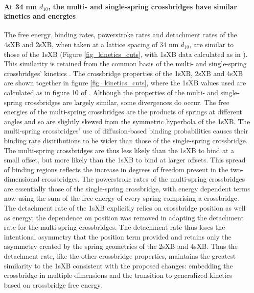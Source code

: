 \documentclass[]{article}
\begin{document}
\paragraph{At 34 nm $d_{10}$, the multi- and single-spring crossbridges have similar kinetics and energies} %
The free energy, binding rates, powerstroke rates and detachment rates of the 4sXB and 2sXB, when taken at a lattice spacing of 34 nm $d_{10}$, are similar to those of the 1sXB (Figure \ref{fig_kinetics_cuts}, with 1sXB data calculated as in \cite{Tanner2007}). 
This similarity is retained from the common basis of the multi- and single-spring crossbridges' kinetics \citep{Pate1989}.
The crossbridge properties of the 1sXB, 2sXB and 4sXB are shown together in figure \ref{fig_kinetics_cuts}, where the 1sXB values used are calculated as in figure 10 of \citet{Tanner:2007:pe115}. 
Although the properties of the multi- and single-spring crossbridges are largely similar, some divergences do occur. 
The free energies of the multi-spring crossbridges are the products of springs at different angles and so are slightly skewed from the symmetric hyperbola of the 1sXB.
The multi-spring crossbridges' use of diffusion-based binding probabilities  causes their binding rate distributions to be wider than those of the single-spring crossbridge.
The multi-spring crossbridges are thus less likely than the 1sXB to bind at a small offset, but more likely than the 1sXB to bind at larger offsets. 
This spread of binding regions reflects the increase in degrees of freedom present in the two-dimensional crossbridges. 
The powerstroke rates of the multi-spring crossbridges are essentially those of the single-spring crossbridge, with energy dependent terms now using the  sum of the free energy of every spring comprising a crossbridge. 
The detachment rate of the 1sXB explicitly relies on crossbridge position as well as energy; the dependence on position was removed in adapting the detachment rate for the multi-spring crossbridges. 
The detachment rate thus loses the intentional asymmetry that the position term provided and retains only the asymmetry created by the spring geometries of the 2sXB and 4sXB. 
Thus the detachment rate, like the other crossbridge properties, maintains the greatest similarity to the 1sXB consistent with the proposed changes: embedding the crossbridge in multiple dimensions and the transition to generalized kinetics based on crossbridge free energy. 
\end{document}
